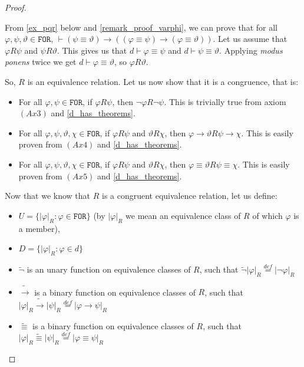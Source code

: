 \documentclass{article}
\theoremstyle{definition}
\theoremstyle{definition}
\theoremstyle{definition}
\theoremstyle{definition}
\theoremstyle{definition}
\newcommand*{\id}{\equiv}
\newcommand*{\ra}{\rightarrow}
\newcommand*{\FOR}{\texttt{FOR}}
\begin{document}
\begin{proof}
\begin{itemize}[]
              From \cref{ex_pqr} below and \cref{remark_proof_varphi}, we can prove that for
              all $\varphi, \psi, \vartheta \in \FOR$, $\vdash (\psi \id \vartheta) \ra
                  ((\varphi \id \psi) \ra (\varphi \id \vartheta))$. Let us assume that $\varphi
                  R \psi$ and $\psi R \vartheta$. This gives us that $d \vdash \varphi \id \psi$
              and $d \vdash \psi \id \vartheta$. Applying \emph{modus ponens} twice we get $d
                  \vdash \varphi \id \vartheta$, so $\varphi R \vartheta$.
    \end{itemize}
    So, $R$ is an equivalence relation. Let us now show that it is a congruence,
    that is:
    \begin{itemize}[]
        \item For all $\varphi, \psi \in \FOR$, if $\varphi R \psi$, then $\lnot \varphi R
                  \lnot \psi$. This is trivially true from axiom $(Ax3)$ and
              \cref{d_has_theorems}.
        \item For all $\varphi, \psi, \vartheta, \chi \in \FOR$, if $\varphi R \psi$ and
              $\vartheta R \chi$, then $\varphi \ra \vartheta R \psi \ra \chi$. This is
              easily proven from $(Ax4)$ and \cref{d_has_theorems}.
        \item For all $\varphi, \psi, \vartheta, \chi \in \FOR$, if $\varphi R \psi$ and
              $\vartheta R \chi$, then $\varphi \id \vartheta R \psi \id \chi$. This is
              easily proven from $(Ax5)$ and \cref{d_has_theorems}.
    \end{itemize}
    Now that we know that $R$ is a congruent equivalence relation, let us define:
    \begin{itemize}
        \item $U = \{ |\varphi|_R : \varphi \in \FOR \}$ (by $|\varphi|_R$ we mean an equivalence class of $R$ of which $\varphi$ is a member),
        \item $D = \{ |\varphi|_R : \varphi \in d\}$
        \item $\tilde{\lnot}$ is an unary function on equivalence classes of $R$, such that $\tilde{\lnot}|\varphi|_R \stackrel{def}{=} |\lnot \varphi|_R$
        \item $\tilde{\ra}$ is a binary function on equivalence classes of $R$, such that $|\varphi|_R \tilde{\ra} |\psi|_R \stackrel{def}{=} |\varphi \ra \psi|_R$
        \item $\tilde{\id}$ is a binary function on equivalence classes of $R$, such that $|\varphi|_R \tilde{\id} |\psi|_R \stackrel{def}{=} |\varphi \id \psi|_R$

\end{itemize}
\end{proof}
\end{document}
